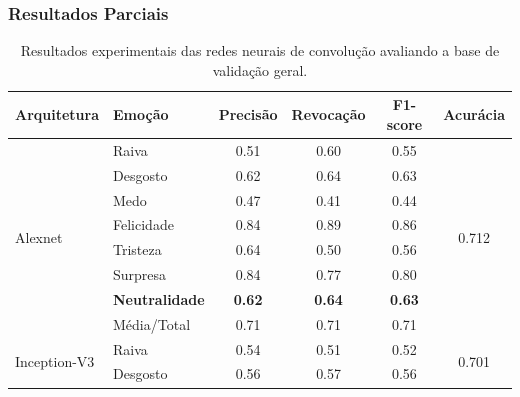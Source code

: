 \documentclass{beamer}
\begin{document}
\begin{frame}
 \frametitle{Resultados Parciais}
\begin{table}[]
\tiny
\centering
\caption{Resultados experimentais das redes neurais de convolução avaliando a base de validação geral.}
\label{table:resultsexp}
\begin{tabular}{llcccc}
\hline
\textbf{Arquitetura}                & \textbf{Emoção}       & \textbf{Precisão} & \textbf{Revocação} & \textbf{F1-score} & \textbf{Acurácia}               \\ \hline
\multirow{8}{*}{Alexnet}            & Raiva                 & 0.51              & 0.60               & 0.55              & \multirow{8}{*}{0.712}          \\
                                    & Desgosto              & 0.62              & 0.64               & 0.63              &                                 \\
                                    & Medo                  & 0.47              & 0.41               & 0.44              &                                 \\
                                    & Felicidade            & 0.84              & 0.89               & 0.86              &                                 \\
                                    & Tristeza              & 0.64              & 0.50               & 0.56              &                                 \\
                                    & Surpresa              & 0.84              & 0.77               & 0.80              &                                 \\
                                    & \scriptsize \textbf{Neutralidade}          & \scriptsize \textbf{0.62}              & \scriptsize \textbf{0.64}               & \scriptsize \textbf{0.63}              &                                 \\
                                    & Média/Total           & 0.71              & 0.71               & 0.71              &                                 \\ \hline
\multirow{8}{*}{Inception-V3}       & Raiva                 & 0.54              & 0.51               & 0.52              & \multirow{8}{*}{0.701}          \\
                                    & Desgosto              & 0.56              & 0.57               & 0.56              &                                 \\

\end{tabular}
\end{table}
\end{frame}
\end{document}
